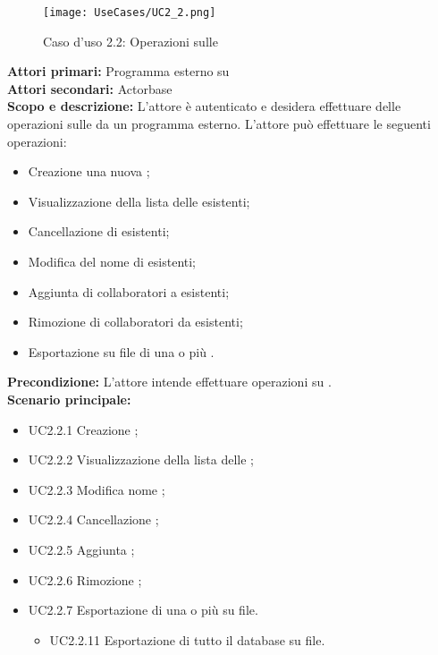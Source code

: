 \documentclass{scalatekids-article}
\begin{document}
\begin{figure}[H]
  \begin{center}
    \texttt{[image: UseCases/UC2\_2.png]}
    \caption{Caso d'uso 2.2: Operazioni sulle }
  \end{center}
\end{figure}
\textbf{Attori primari:} Programma esterno su \\
\textbf{Attori secondari:} Actorbase\\
\textbf{Scopo e descrizione:} L'attore è autenticato e desidera effettuare delle operazioni sulle  da un programma  esterno. L'attore può effettuare le seguenti operazioni:
\begin{itemize}
\item Creazione una nuova ;
\item Visualizzazione della lista delle  esistenti;
\item Cancellazione di  esistenti;
\item Modifica del nome di  esistenti;
\item Aggiunta di collaboratori a  esistenti;
\item Rimozione di collaboratori da  esistenti;
\item Esportazione su file di una o più .
\end{itemize}
\textbf{Precondizione:} L'attore intende effettuare operazioni su .\\
\textbf{Scenario principale:}
\begin{itemize}
\item UC2.2.1 Creazione ;
\item UC2.2.2 Visualizzazione della lista delle ;
\item UC2.2.3 Modifica nome ;
\item UC2.2.4 Cancellazione ;
\item UC2.2.5 Aggiunta ;
\item UC2.2.6 Rimozione ;
\item UC2.2.7 Esportazione di una o più  su file.
  \begin{itemize}
  \item UC2.2.11 Esportazione di tutto il database su file.
  \end{itemize}
\end{itemize}
\end{document}
